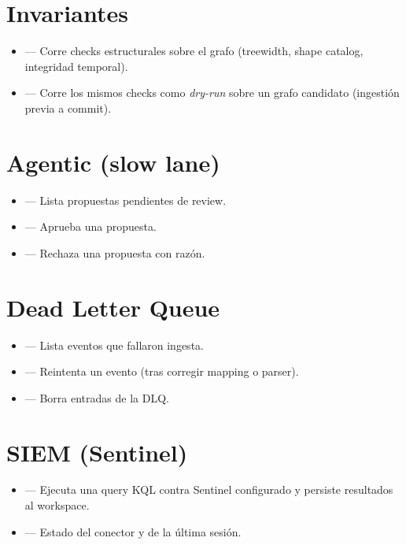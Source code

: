 \section{Invariantes}

\begin{itemize}
    \item {} — Corre checks estructurales
    sobre el grafo (treewidth, shape catalog, integridad temporal).
    \item {} — Corre los
    mismos checks como \emph{dry-run} sobre un grafo candidato
    (ingestión previa a commit).
\end{itemize}

\section{Agentic (slow lane)}

\begin{itemize}
    \item {} — Lista propuestas
    pendientes de review.
    \item {} — Aprueba una
    propuesta.
    \item {} — Rechaza una propuesta
    con razón.
\end{itemize}

\section{Dead Letter Queue}

\begin{itemize}
    \item {} — Lista eventos que
    fallaron ingesta.
    \item {} — Reintenta un evento
    (tras corregir mapping o parser).
    \item {} — Borra entradas de la
    DLQ.
\end{itemize}

\section{SIEM (Sentinel)}

\begin{itemize}
    \item {} — Ejecuta una query KQL contra Sentinel
    configurado y persiste resultados al workspace.
    \item {} — Estado del conector y de la
    última sesión.
\end{itemize}


